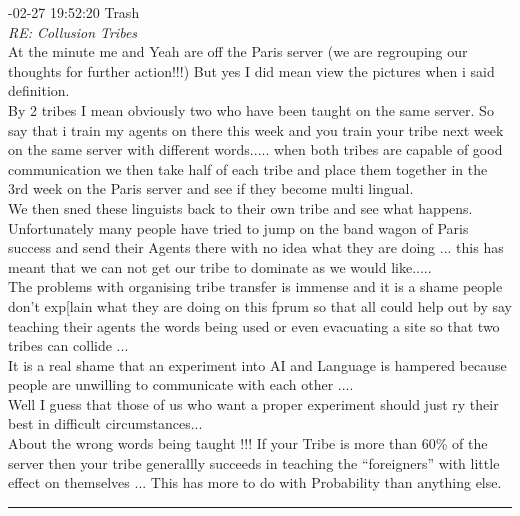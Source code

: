 \begin{mail}
{-02-27 19:52:20	Trash}\\
{\itshape RE: Collusion Tribes}\\
At the minute me and Yeah are off the Paris server (we are regrouping our thoughts for further action!!!)
But yes I did mean view the pictures when i said definition.\\
By 2 tribes I mean obviously two who have been taught on the same server.
So say that i train my agents on there this week and you train your tribe next week on the same server with different words..... when both tribes are capable of good communication we then take half of each tribe and place them together in the 3rd week on the Paris server and see if they become multi lingual.\\
We then sned these linguists back to their own tribe and see what happens.\\
Unfortunately many people have tried to jump on the band wagon of Paris success and send their Agents there with no idea what they are doing ... this has meant that we can not get our tribe to dominate as we would like.....\\
The problems with organising tribe transfer is immense and it is a shame people don't exp[lain what they are doing on this fprum so that all could help out by say teaching their agents the words being used or even evacuating a site so that two tribes can collide ...\\
It is a real shame that an experiment into AI and Language is hampered because people are unwilling to communicate with each other .... \\
Well I guess that those of us who want a proper experiment should just ry their best in difficult circumstances...\\
About the wrong words being taught !!! If your Tribe is more than 60\% of the server then your tribe generallly succeeds in teaching the ``foreigners'' with little effect on themselves ... This has more to do with Probability than anything else.

\rule{0.8\textwidth}{.4pt}


\end{mail}
